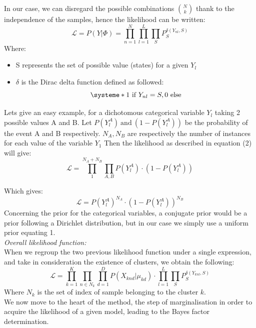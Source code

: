 \documentclass[twocolumn,12pt]{article}
\begin{document}
In our case, we can disregard the possible combinations ${N\choose k}$ thank to the independence of the samples, hence the likelihood can be written:
\begin{equation}
    \mathcal{L}=P(Y|\Phi)=\prod_{n=1}^{N}\prod_{l=1}^{L}\prod_SP_{S}^{\delta(Y_{nl},S)}
\end{equation}
Where:
\begin{itemize}
    \item S represents the set of possible value (states) for a given $Y_l$
    \item $\delta$ is the Dirac delta function defined as followed:\\
    \[ \systeme*{1\ \text{if}\ Y_{nl} = S,0\ \text{else}} \]
\end{itemize}
Lets give an easy example, for a dichotomous categorical variable $Y_l$ taking 2 possible values A and B.
Let $P(Y_{l}^A)\ \text{and}\ (1-P(Y_{l}^A))$ be the probability of the event A and B respectively.
$N_A, N_B$ are respectively the number of instances for each value of the variable $Y_1$ Then the likelihood as described in equation (2) will give:\\

$$\mathcal{L}  =  \prod_{1}^{N_A+N_B}\prod_{A,B}P(Y_{l}^A)\cdotp (1-P(Y_{l}^A))$$


Which gives:
\begin{equation}
    \mathcal{L}  =  P(Y_{l}^A)^{N_A}\cdotp (1-P(Y_{l}^A))^{N_B}
    \label{equ:exCat}
\end{equation}
Concerning the prior for the categorical variables, a conjugate prior would be a prior following a Dirichlet distribution, but in our case we simply use a uniform prior equating 1.\\

\emph{Overall likelihood function:}\\
When we regroup the two previous likelihood function under a single expression, and take in consideration the existence of clusters, we obtain the following:
\begin{equation}
    \mathcal{L} = \prod_{k=1}^K\prod_{n\in N_k}\prod_{d=1}^{D}P(X_{knd}|\mu_{kd})\cdotp \prod_{l=1}^{L}\prod_SP_{S}^{\delta(Y_{knl},S)}
    \label{equ:LwithClus}
\end{equation}
Where $N_k$ is the set of index of sample belonging to the cluster $k$.\\
We now move to the heart of the method, the step of marginalisation in order to acquire the likelihood of a given model, leading to the Bayes factor determination.
\end{document}
